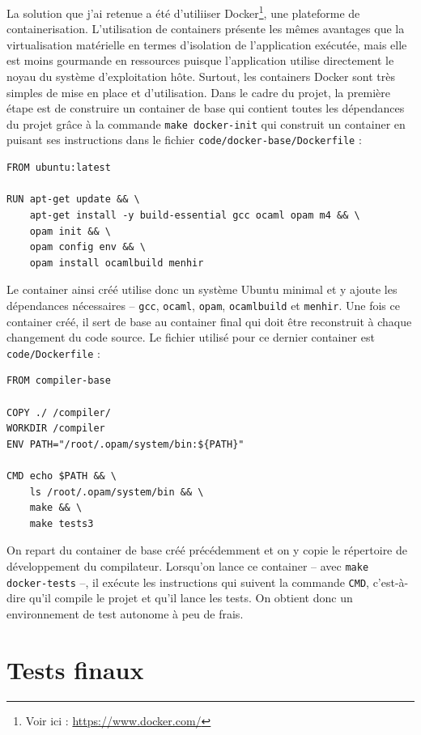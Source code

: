 \documentclass[paper=a4, fontsize=11pt]{scrartcl}
\numberwithin{figure}{section}			%
\numberwithin{table}{section}				%
\begin{document}
La solution que j'ai retenue a été d'utiliiser Docker\footnote{Voir ici : \url{https://www.docker.com/}}, une plateforme de containerisation. L'utilisation de containers présente les mêmes avantages que la virtualisation matérielle en termes d'isolation de l'application exécutée, mais elle est moins gourmande en ressources puisque l'application utilise directement le noyau du système d'exploitation hôte. Surtout, les containers Docker sont très simples de mise en place et d'utilisation. Dans le cadre du projet, la première étape est de construire un container de base qui contient toutes les dépendances du projet grâce à la commande \texttt{make docker-init} qui construit un container en puisant ses instructions dans le fichier \texttt{code/docker-base/Dockerfile} :

\begin{verbatim}
FROM ubuntu:latest

RUN apt-get update && \
    apt-get install -y build-essential gcc ocaml opam m4 && \
    opam init && \
    opam config env && \
    opam install ocamlbuild menhir
\end{verbatim}

Le container ainsi créé utilise donc un système Ubuntu minimal et y ajoute les dépendances nécessaires -- \texttt{gcc}, \texttt{ocaml}, \texttt{opam}, \texttt{ocamlbuild} et \texttt{menhir}. Une fois ce container créé, il sert de base au container final qui doit être reconstruit à chaque changement du code source. Le fichier utilisé pour ce dernier container est \texttt{code/Dockerfile} :

\begin{verbatim}
FROM compiler-base

COPY ./ /compiler/
WORKDIR /compiler
ENV PATH="/root/.opam/system/bin:${PATH}"

CMD echo $PATH && \
    ls /root/.opam/system/bin && \
    make && \
    make tests3
\end{verbatim}

On repart du container de base créé précédemment et on y copie le répertoire de développement du compilateur. Lorsqu'on lance ce container -- avec \texttt{make docker-tests} --, il exécute les instructions qui suivent la commande \texttt{CMD}, c'est-à-dire qu'il compile le projet et qu'il lance les tests. On obtient donc un environnement de test autonome à peu de frais.

\section{Tests finaux}
\end{document}
